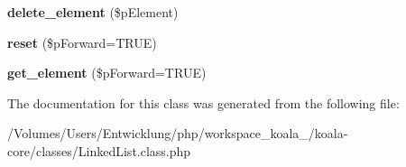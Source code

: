 \begin{DoxyCompactItemize}
\item 
\hypertarget{class_linked_list_ac0bc92402de282810821085a70b66f3b}{
{\bfseries delete\_\-element} (\$pElement)}
\label{class_linked_list_ac0bc92402de282810821085a70b66f3b}

\item 
\hypertarget{class_linked_list_aac5822371317e6832fa8b41c2d78c362}{
{\bfseries reset} (\$pForward=TRUE)}
\label{class_linked_list_aac5822371317e6832fa8b41c2d78c362}

\item 
\hypertarget{class_linked_list_a620fa90388d99080869380bc967f82b6}{
{\bfseries get\_\-element} (\$pForward=TRUE)}
\label{class_linked_list_a620fa90388d99080869380bc967f82b6}

\end{DoxyCompactItemize}


The documentation for this class was generated from the following file:\begin{DoxyCompactItemize}
\item 
/Volumes/Users/Entwicklung/php/workspace\_\-koala\_/koala-\/core/classes/LinkedList.class.php\end{DoxyCompactItemize}

